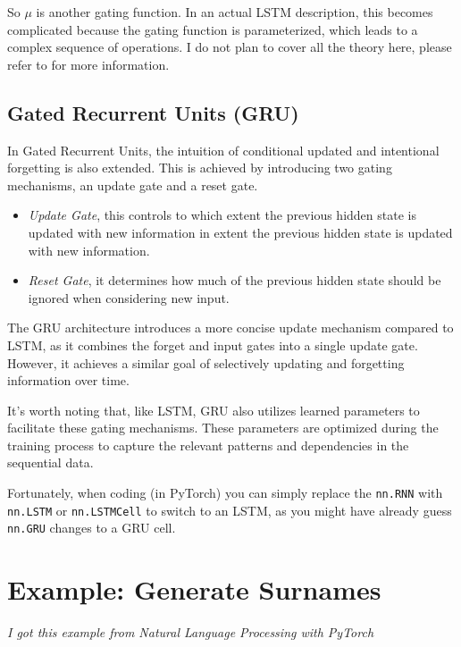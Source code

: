 \documentclass[12pt]{IEEEtran}
\begin{document}
So $\mu$ is another gating function. In an actual LSTM description, this becomes
complicated because the gating function is parameterized, which leads to a
complex sequence of operations. I do not plan to cover all the theory here,
please refer to \cite{colah} for more information.

\subsection{Gated Recurrent Units (GRU)}\label{sub:gru}

In Gated Recurrent Units, the intuition of conditional updated and intentional
forgetting is also extended. This is achieved by introducing two gating
mechanisms, an update gate and a reset gate.

\begin{itemize}
    \item \emph{Update Gate}, this controls to which extent the previous
    hidden state is updated with new information in extent the previous hidden
    state is updated with new information.

    \item \emph{Reset Gate}, it determines how much of the previous hidden
    state should be ignored when considering new input.
\end{itemize}

The GRU architecture introduces a more concise update mechanism compared to
LSTM, as it combines the forget and input gates into a single update gate.
However, it achieves a similar goal of selectively updating and forgetting
information over time.

It's worth noting that, like LSTM, GRU also utilizes learned parameters to
facilitate these gating mechanisms. These parameters are optimized during the
training process to capture the relevant patterns and dependencies in the
sequential data.

Fortunately, when coding (in PyTorch) you can simply replace the \verb|nn.RNN|
with \verb|nn.LSTM| or \verb|nn.LSTMCell| to switch to an LSTM, as you might
have already guess \verb|nn.GRU| changes to a GRU cell.

\section{Example: Generate Surnames}

\emph{I got this example from Natural Language Processing with PyTorch
\cite{nlptorch}}
\end{document}
